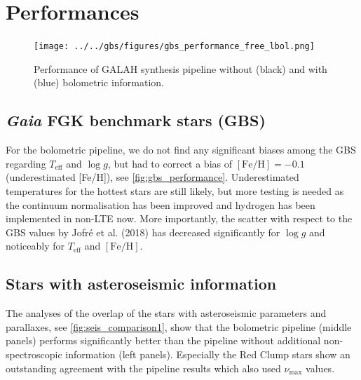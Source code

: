 \documentclass[a4paper,11pt,english]{article}
\begin{document}
\section{Performances}

\begin{figure}[!ht]
\centering
\texttt{[image: ../../gbs/figures/gbs\_performance\_free\_lbol.png]}
\caption{Performance of GALAH synthesis pipeline without (black) and with (blue) bolometric information.}
\label{fig:gbs_performance}
\end{figure}

\subsection{\textit{Gaia} FGK benchmark stars (GBS)}

For the bolometric pipeline, we do not find any significant biases among the GBS regarding $T_\text{eff}$ and $\log g$, but had to correct a bias of $\mathrm{[Fe/H]}  = -0.1$ (underestimated [Fe/H]), see \autoref{fig:gbs_performance}. Underestimated temperatures for the hottest stars are still likely, but more testing is needed as the continuum normalisation has been improved and hydrogen has been implemented in non-LTE now. More importantly, the scatter with respect to the GBS values by Jofré et al. (2018) has decreased significantly for $\log g$ and noticeably for $T_\text{eff}$ and $\mathrm{[Fe/H]}$.

\subsection{Stars with asteroseismic information}

The analyses of the overlap of the stars with asteroseismic parameters and parallaxes, see \autoref{fig:seis_comparison1}, show that the bolometric pipeline (middle panels) performs significantly better than the pipeline without additional non-spectroscopic information (left panels). Especially the Red Clump stars show an outstanding agreement with the pipeline results which also used $\nu_\text{max}$ values.
\end{document}
